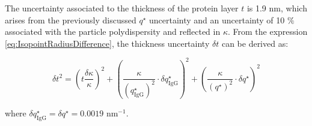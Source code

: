 The uncertainty associated to the thickness of the protein layer $t$ is 1.9 nm, which arises from the previously discussed $q^{\star}$ uncertainty and an uncertainty of 10 $\%$ associated with the particle polydispersity and reflected in $\kappa$. From the expression \ref{eq:IsopointRadiusDifference}, the thickness uncertainty $\delta t$ can be derived as:

\begin{equation}
\delta t^2 = \left( t \frac{\delta \kappa}{\kappa} \right)^2 + \left( \frac{\kappa}{\left(q^{\star}_{\text{IgG}}\right)^2} \cdot \delta q^{\star}_{\text{IgG}} \right)^2 + \left( \frac{\kappa}{\left(q^{\star}\right)^2} \cdot \delta q^{\star}\right)^2
\end{equation}

where $\delta q^{\star}_{\text{IgG}}=\delta q^{\star}=0.0019$ nm$^{-1}$.
